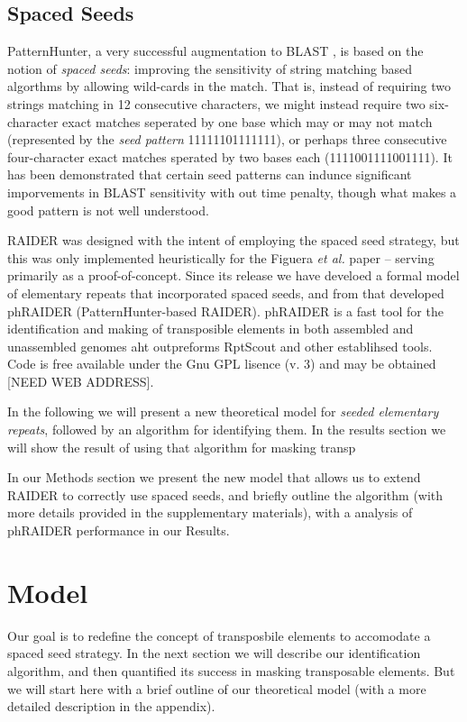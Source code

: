 \documentclass[11pt]{article}
\begin{document}
\subsection*{Spaced Seeds}
 
PatternHunter, a very successful augmentation to BLAST
\cite{Li:2004wl,Altschul:1997p843}, is based on the notion of {\it
  spaced seeds}: improving the sensitivity of string matching based
algorthms by allowing wild-cards in the match.  That is, instead of
requiring two strings matching in 12 consecutive characters, we might
instead require two six-character exact matches seperated by one base
which may or may not match (represented by the {\it seed pattern}
11111101111111), or perhaps three consecutive four-character exact
matches sperated by two bases each (1111001111001111). It has been
demonstrated that certain seed patterns can indunce significant
imporvements in BLAST sensitivity with out time penalty, though what
makes a good pattern is not well understood.


RAIDER was designed with the intent of employing the spaced seed
strategy, but this was only implemented heuristically for the Figuera
{\it et al.} paper \cite{Figueroa:2013cz} -- serving primarily as a
proof-of-concept.  Since its release we have develoed a formal model
of elementary repeats that incorporated spaced seeds, and from that
developed phRAIDER (PatternHunter-based RAIDER).  phRAIDER is a fast
tool for the identification and making of transposible elements in
both assembled and unassembled genomes aht outpreforms RptScout and
other establihsed tools. Code is free available under the Gnu GPL
lisence (v. 3) and  may be obtained [NEED WEB ADDRESS].  


In the following we will present a new theoretical model for {\it
  seeded elementary repeats}, followed by an algorithm for identifying
them.  In the results section we will show the result of using that
algorithm for masking transp

In our Methods section
we present the new model that allows us to extend RAIDER to correctly
use spaced seeds, and briefly outline the algorithm (with more details
provided in the supplementary materials), with a analysis of phRAIDER
performance in our Results.


\section*{Model}

Our goal is to redefine the concept of transposbile elements to
accomodate a spaced seed strategy.  In the next section we will describe our
identification algorithm, and then quantified its success in 
masking transposable elements. But we will start here with a brief
outline of our theoretical model (with a more detailed description in
the appendix).
\end{document}
